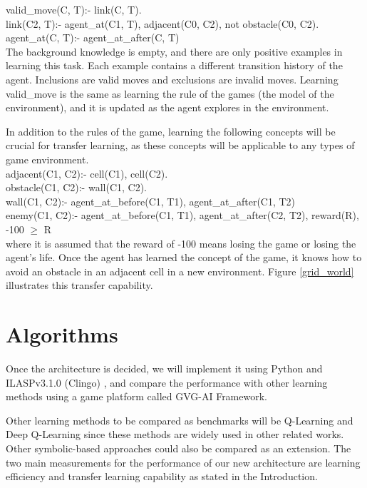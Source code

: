 valid\_move(C, T):- link(C, T).
\\
link(C2, T):- agent\_at(C1, T), adjacent(C0, C2), not obstacle(C0, C2).\\
agent\_at(C, T):- agent\_at\_after(C, T) \\

The background knowledge is empty, and there are only positive examples in learning this task. Each example contains a different transition history of the agent. Inclusions are valid moves and exclusions are invalid moves. Learning valid\_move is the same as learning the rule of the games (the model of the environment), and it is updated as the agent explores in the environment.

In addition to the rules of the game, learning the following concepts will be crucial for transfer learning, as these concepts will be applicable to any types of game environment.  \\

adjacent(C1, C2):- cell(C1), cell(C2). \\
obstacle(C1, C2):- wall(C1, C2). \\
wall(C1, C2):- agent\_at\_before(C1, T1), agent\_at\_after(C1, T2) \\
enemy(C1, C2):- agent\_at\_before(C1, T1), agent\_at\_after(C2, T2), reward(R), -100 $\geq$ R \\

where it is assumed that the reward of -100 means losing the game or losing the agent's life. Once the agent has learned the concept of the game, it knows how to avoid an obstacle in an adjacent cell in a new environment. Figure \ref{grid_world} illustrates this transfer capability.



\section{Algorithms}
\label{algorithms}


Once the architecture is decided, we will implement it using Python and ILASPv3.1.0 (Clingo) \cite{Law2017}, and compare the performance with other learning methods using a game platform called GVG-AI Framework.

Other learning methods to be compared as benchmarks will be Q-Learning and Deep Q-Learning since these methods are widely used in other related works. Other symbolic-based approaches could also be compared as an extension. The two main measurements for the performance of our new architecture are learning efficiency and transfer learning capability as stated in the Introduction.

